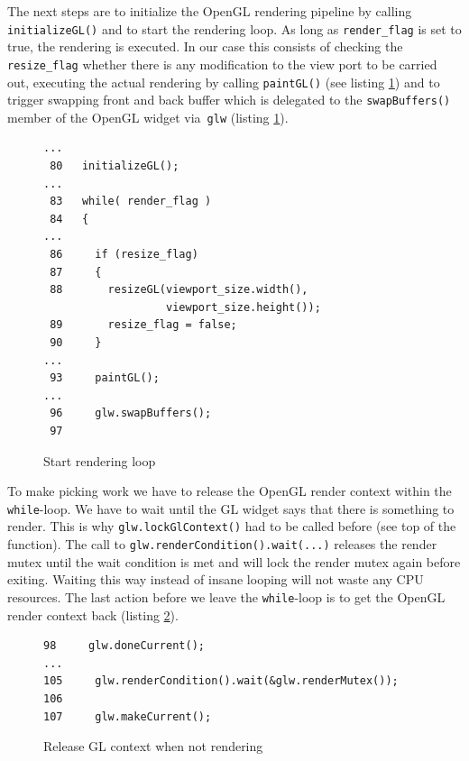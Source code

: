 \documentclass[jou,noapacite]{apa}
\begin{document}
The next steps are to initialize the OpenGL rendering pipeline by
calling \lstinline|initializeGL()| and to start the rendering loop.
%
As long as \lstinline|render_flag| is set to true, the rendering is executed.
%
In our case this consists of checking the \lstinline|resize_flag| whether there
is any modification to the view port to be carried out, executing the actual
rendering by calling \lstinline|paintGL()| (see listing \ref{lst:rloop}) and to trigger swapping
front and back buffer which is delegated to the \lstinline|swapBuffers()| member
of the OpenGL widget via~\lstinline|glw| (listing \ref{lst:rloop}).
%
\begin{figure}[h]
\begin{lstlisting}[basicstyle=\scriptsize]
...
 80   initializeGL();
...
 83   while( render_flag )
 84   {
...
 86     if (resize_flag)
 87     {
 88       resizeGL(viewport_size.width(),
                   viewport_size.height());
 89       resize_flag = false;
 90     }
...
 93     paintGL();
...
 96     glw.swapBuffers();
 97
\end{lstlisting}
\caption{Start rendering loop}
\label{lst:rloop}
\end{figure}

To make picking work we have to release the OpenGL render context within
the \lstinline[keywordstyle=\color{black}]|while|-loop.
%
We have to wait until the GL widget says that there is something to render.
%
This is why \lstinline|glw.lockGlContext()| had to be called before (see top of
the function).
%
The call to \lstinline|glw.renderCondition().wait(...)| releases the render
mutex until the wait condition is met and will lock the render mutex again
before exiting.
%
Waiting this way instead of insane looping will not waste any CPU resources.
%
The last action before we leave the \lstinline[keywordstyle=\color{black}]|while|-loop is to get the OpenGL
render context back (listing \ref{lst:waitcond}).
%
\begin{figure}[h]
\begin{lstlisting}[basicstyle=\scriptsize]
 98     glw.doneCurrent();
...
105     glw.renderCondition().wait(&glw.renderMutex());
106
107     glw.makeCurrent();
\end{lstlisting}
\caption{Release GL context when not rendering}
\label{lst:waitcond}
\end{figure}
\end{document}
